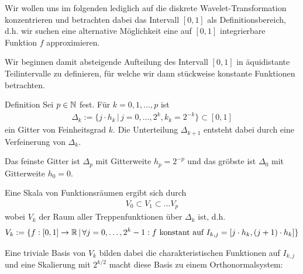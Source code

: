 Wir wollen uns im folgenden lediglich auf die diskrete Wavelet-Transformation konzentrieren und betrachten dabei 
das Intervall $[0,1]$ als Definitionsbereich, d.h. wir suchen eine alternative Möglichkeit eine auf $[0,1]$ integrierbare 
Funktion $f$ approximieren. 

Wir beginnen damit absteigende Aufteilung des Intervall $[0,1]$ in äquidistante Teilintervalle zu definieren, 
für welche wir dann stückweise konstante Funktionen betrachten. 

\begin{colbox}{Definition}
  Sei $p\in\mathbb N$ fest. Für $k=0,1,\dots,p$ ist 
  \begin{align*}
    \Delta_k := \{j\cdot h_k \,|\, j=0,\dots,2^k, k_k=2^{-k}\} \subset [0,1]
  \end{align*}
  ein Gitter von Feinheitsgrad $k$. Die Unterteilung $\Delta_{k+1}$ entsteht dabei durch eine Verfeinerung 
  von $\Delta_k$. 

  Das feinste Gitter ist $\Delta_p$ mit Gitterweite $h_p=2^{-p}$ und das gröbste ist $\Delta_0$ mit Gitterweite $h_0=0$.

  Eine Skala von Funktionsräumen ergibt sich durch 
  \begin{align*}
    V_0 \subset V_1 \subset \dots V_p
  \end{align*}
  wobei $V_k$ der Raum aller Treppenfunktionen über $\Delta_k$ ist, d.h. 
  \begin{align*}
    V_k := \{f:[0,1]\to\mathbb R \,|\, \forall j=0,\dots,2^k-1: f \text{ konstant auf } I_{k,j}=[j\cdot h_k, (j+1)\cdot h_k] \}
  \end{align*}
\end{colbox}

Eine triviale Basis von $V_k$ bilden dabei die charakteristischen Funktionen auf $I_{k,j}$ und eine Skalierung 
mit $2^{k/2}$ macht diese Basis zu einem Orthonormalsystem:

